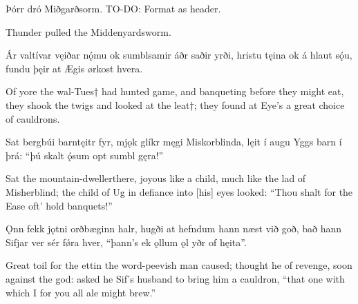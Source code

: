 Þórr dró Miðgarðsorm. TO-DO: Format as header.

Thunder pulled the Middenyardsworm.\footnotemark[1]

Ár valtívar \hld vęiðar nǫ́mu
ok sumblsamir \hld áðr saðir yrði,
hristu tęina \hld ok á hlaut sǫ́u,
fundu þęir at Ægis \hld ørkost hvera.

Of yore the wal-Tues† had hunted game\footnotemark[1], and banqueting before they might eat\footnotemark[2], they shook the twigs and looked at the leat†\footnotemark[3]; they found at Eye’s a great choice of cauldrons.\footnotemark[4]

Sat bergbúi \hld barntęitr fyr,
mjǫk glíkr męgi \hld Miskorblinda,
lęit í augu \hld Yggs barn í þrá:
“þú skalt ǫ́sum \hld opt sumbl gęra!”

Sat the mountain-dweller\footnotemark[1] there, joyous like a child, much like the lad of Misherblind\footnotemark[2]; the child of Ug in defiance into [his] eyes looked: “Thou shalt for the Ease oft’ hold banquets!”\footnotemark[3]

Ǫnn fekk jǫtni \hld orðbæginn halr,
hugði at hefndum \hld hann næst við goð,
bað hann Sifjar ver \hld sér fǿra hver,
“þann’s ek ǫllum ǫl \hld yðr of hęita”.

Great toil for the ettin the word-peevish man caused; thought he of revenge, soon against the god: asked he Sif’s husband to bring him a cauldron, “that one with which I for you all ale might brew.”\footnotemark[1]

